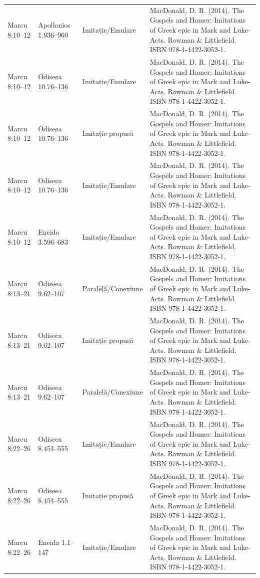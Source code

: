 \documentclass[12pt,a4paper,twoside,openany]{book}
\begin{document}
\begin{longtable}{L{1.4cm}L{1.7cm}L{3.1cm}L{8.4cm}}
Marcu 8:10–12 & Apollonios 1.936–960 & Imitație/Emulare & MacDonald, D. R. (2014). The Gospels and Homer: Imitations of Greek epic in Mark and Luke-Acts. Rowman \& Littlefield. ISBN 978-1-4422-3052-1. \\
Marcu 8:10–12 & Odiseea 10.76–136 & Imitație/Emulare & MacDonald, D. R. (2014). The Gospels and Homer: Imitations of Greek epic in Mark and Luke-Acts. Rowman \& Littlefield. ISBN 978-1-4422-3052-1. \\
Marcu 8:10–12 & Odiseea 10.76–136 & Imitație propusă & MacDonald, D. R. (2014). The Gospels and Homer: Imitations of Greek epic in Mark and Luke-Acts. Rowman \& Littlefield. ISBN 978-1-4422-3052-1. \\
Marcu 8:10–12 & Odiseea 10.76–136 & Imitație/Emulare & MacDonald, D. R. (2014). The Gospels and Homer: Imitations of Greek epic in Mark and Luke-Acts. Rowman \& Littlefield. ISBN 978-1-4422-3052-1. \\
Marcu 8:10–12 & Eneida 3.596–683 & Imitație/Emulare & MacDonald, D. R. (2014). The Gospels and Homer: Imitations of Greek epic in Mark and Luke-Acts. Rowman \& Littlefield. ISBN 978-1-4422-3052-1. \\
Marcu 8:13–21 & Odiseea 9.62–107 & Paralelă/Conexiune & MacDonald, D. R. (2014). The Gospels and Homer: Imitations of Greek epic in Mark and Luke-Acts. Rowman \& Littlefield. ISBN 978-1-4422-3052-1. \\
Marcu 8:13–21 & Odiseea 9.62–107 & Imitație propusă & MacDonald, D. R. (2014). The Gospels and Homer: Imitations of Greek epic in Mark and Luke-Acts. Rowman \& Littlefield. ISBN 978-1-4422-3052-1. \\
Marcu 8:13–21 & Odiseea 9.62–107 & Paralelă/Conexiune & MacDonald, D. R. (2014). The Gospels and Homer: Imitations of Greek epic in Mark and Luke-Acts. Rowman \& Littlefield. ISBN 978-1-4422-3052-1. \\
Marcu 8:22–26 & Odiseea 8.454–555 & Imitație/Emulare & MacDonald, D. R. (2014). The Gospels and Homer: Imitations of Greek epic in Mark and Luke-Acts. Rowman \& Littlefield. ISBN 978-1-4422-3052-1. \\
Marcu 8:22–26 & Odiseea 8.454–555 & Imitație propusă & MacDonald, D. R. (2014). The Gospels and Homer: Imitations of Greek epic in Mark and Luke-Acts. Rowman \& Littlefield. ISBN 978-1-4422-3052-1. \\
Marcu 8:22–26 & Eneida 1.1–147 & Imitație/Emulare & MacDonald, D. R. (2014). The Gospels and Homer: Imitations of Greek epic in Mark and Luke-Acts. Rowman \& Littlefield. ISBN 978-1-4422-3052-1. \\

\end{longtable}
\end{document}
